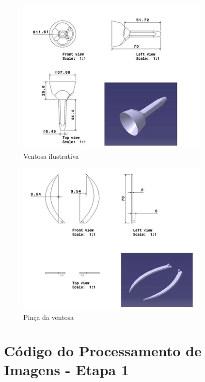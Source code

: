 \begin{apendicesenv}
\begin{figure}[H]
		\centering
			\includegraphics[scale=1.0]{figuras/tec14.png}
		\caption{Ventosa ilustrativa}
		\label{tec14}
\end{figure}

\begin{figure}[H]
		\centering
			\includegraphics[scale=1.0]{figuras/tec15.png}
		\caption{Pinça da ventosa}
		\label{tec15}
\end{figure}

\chapter{Código do Processamento de Imagens - Etapa 1}


\end{apendicesenv}
